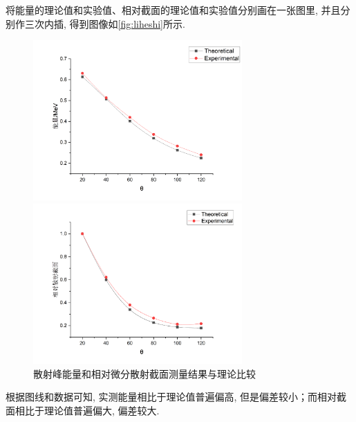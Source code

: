 \documentclass[font=default]{mpltx}
\begin{document}
      将能量的理论值和实验值、相对截面的理论值和实验值分别画在一张图里, 并且分别作三次内插, 得到图像如\autoref{fig:liheshi}所示. 
      \begin{figure}[htbp]
        \centering
        \begin{minipage}[t]{0.6\textwidth}
        \centering
        \includegraphics[width=8cm]{fig/nengliang.png}
        \end{minipage}
        \begin{minipage}[t]{0.6\textwidth}
        \centering
        \includegraphics[width=8cm]{fig/jiemian.png}
        \end{minipage}
        \caption{散射峰能量和相对微分散射截面测量结果与理论比较}
        \label{fig:liheshi}
      \end{figure}

      根据图线和数据可知, 实测能量相比于理论值普遍偏高, 但是偏差较小；而相对截面相比于理论值普遍偏大, 偏差较大.
\end{document}
